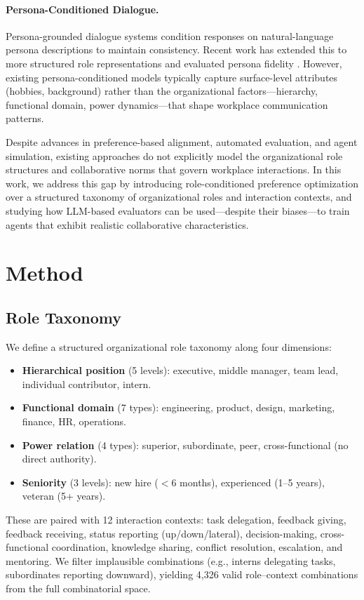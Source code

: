\documentclass{article}
\begin{document}
\paragraph{Persona-Conditioned Dialogue.}
Persona-grounded dialogue systems \citep{zhang2018personalizing} condition responses on natural-language persona descriptions to maintain consistency. Recent work has extended this to more structured role representations and evaluated persona fidelity \citep{chen2024personagym}. However, existing persona-conditioned models typically capture surface-level attributes (hobbies, background) rather than the organizational factors---hierarchy, functional domain, power dynamics---that shape workplace communication patterns.

Despite advances in preference-based alignment, automated evaluation, and agent simulation, existing approaches do not explicitly model the organizational role structures and collaborative norms that govern workplace interactions. In this work, we address this gap by introducing role-conditioned preference optimization over a structured taxonomy of organizational roles and interaction contexts, and studying how LLM-based evaluators can be used---despite their biases---to train agents that exhibit realistic collaborative characteristics.


\section{Method}

\subsection{Role Taxonomy}

We define a structured organizational role taxonomy along four dimensions:
\begin{itemize}
    \item \textbf{Hierarchical position} (5 levels): executive, middle manager, team lead, individual contributor, intern.
    \item \textbf{Functional domain} (7 types): engineering, product, design, marketing, finance, HR, operations.
    \item \textbf{Power relation} (4 types): superior, subordinate, peer, cross-functional (no direct authority).
    \item \textbf{Seniority} (3 levels): new hire ($<$6 months), experienced (1--5 years), veteran (5+ years).
\end{itemize}
These are paired with 12 interaction contexts: task delegation, feedback giving, feedback receiving, status reporting (up/down/lateral), decision-making, cross-functional coordination, knowledge sharing, conflict resolution, escalation, and mentoring. We filter implausible combinations (e.g., interns delegating tasks, subordinates reporting downward), yielding 4,326 valid role--context combinations from the full combinatorial space.
\end{document}
